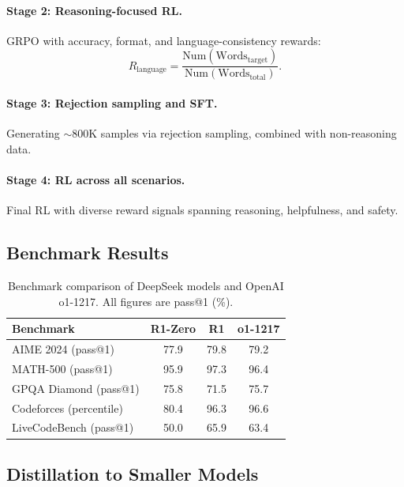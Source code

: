 \documentclass[12pt,a4paper]{report}
\theoremstyle{definition}
\begin{document}
\paragraph{Stage 2: Reasoning-focused RL.} GRPO with accuracy, format, and language-consistency rewards:
\begin{equation}
    R_{\text{language}} = \frac{\text{Num}(\text{Words}_{\text{target}})}{\text{Num}(\text{Words}_{\text{total}})}.
\end{equation}

\paragraph{Stage 3: Rejection sampling and SFT.} Generating $\sim$800K samples via rejection sampling, combined with non-reasoning data.

\paragraph{Stage 4: RL across all scenarios.} Final RL with diverse reward signals spanning reasoning, helpfulness, and safety.

\subsection{Benchmark Results}

\begin{table}[ht]
\centering
\caption{Benchmark comparison of DeepSeek models and OpenAI o1-1217. All figures are pass@1 (\%).}
\label{tab:deepseek-r1-results}
\begin{tabular}{lccc}
\toprule
\textbf{Benchmark} & \textbf{R1-Zero} & \textbf{R1} & \textbf{o1-1217} \\
\midrule
AIME 2024 (pass@1)       & 77.9  & 79.8  & 79.2 \\
MATH-500 (pass@1)        & 95.9  & 97.3  & 96.4 \\
GPQA Diamond (pass@1)    & 75.8  & 71.5  & 75.7 \\
Codeforces (percentile)  & 80.4  & 96.3  & 96.6 \\
LiveCodeBench (pass@1)   & 50.0  & 65.9  & 63.4 \\
\bottomrule
\end{tabular}
\end{table}

\subsection{Distillation to Smaller Models}
\end{document}
